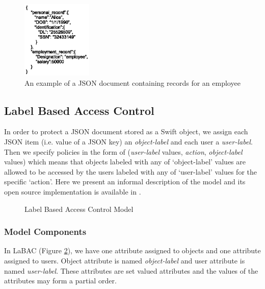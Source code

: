 \begin{figure}
  \centering
    \includegraphics[width=0.3\textwidth]{CODASPY15/json-data}
 \caption{An example of a JSON document containing   records for an employee}
   \label{fig:json-data}
\end{figure}



\subsection{Label Based Access Control}
In order to protect a JSON document stored as a Swift object, we assign each JSON item (i.e. value of a JSON key) an \emph{object-label} and each user a \emph{user-label}. Then we specify policies  in the form of  (\emph{user-label} values, \emph{action},  \emph{object-label} values)   which means that objects labeled with any of `object-label' values are allowed to be accessed by the users labeled with any of  `user-label' values for the specific `action'. Here we present an informal description of the model and its open source implementation is available in \cite{labac}.

\begin{figure}
\centering
{}
\caption{Label Based Access Control Model}
\label{fig:labac-model}
\end{figure}


\subsubsection{Model Components}

In LaBAC (Figure \ref{fig:labac-model}), we have one attribute assigned to objects and one attribute assigned to users. Object attribute is named  \emph{object-label} and user attribute is named \emph{user-label}. These attributes are set valued attributes and the values of the attributes may form a partial order.

